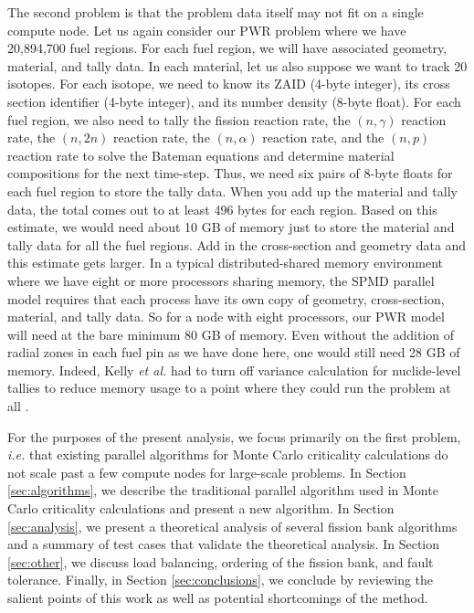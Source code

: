 The second problem is that the problem data itself may not fit on a
single compute node. Let us again consider our PWR problem where we
have 20,894,700 fuel regions. For each fuel region, we will have
associated geometry, material, and tally data. In each material, let
us also suppose we want to track 20 isotopes. For each isotope, we
need to know its ZAID (4-byte integer), its cross section identifier
(4-byte integer), and its number density (8-byte float). For each fuel
region, we also need to tally the fission reaction rate, the
$(n,\gamma)$ reaction rate, the $(n,2n)$ reaction rate, the
$(n,\alpha)$ reaction rate, and the $(n,p)$ reaction rate to solve the
Bateman equations and determine material compositions for the next
time-step. Thus, we need six pairs of 8-byte floats for each fuel
region to store the tally data. When you add up the material and tally
data, the total comes out to at least 496 bytes for each region. Based
on this estimate, we would need about 10 GB of memory just to store
the material and tally data for all the fuel regions. Add in the
cross-section and geometry data and this estimate gets larger. In a
typical distributed-shared memory environment where we have eight or
more processors sharing memory, the SPMD parallel model requires that
each process have its own copy of geometry, cross-section, material,
and tally data. So for a node with eight processors, our PWR model
will need at the bare minimum 80 GB of memory. Even without the
addition of radial zones in each fuel pin as we have done here, one
would still need 28 GB of memory. Indeed, Kelly {\em et al.} had to
turn off variance calculation for nuclide-level tallies to reduce
memory usage to a point where they could run the problem at all
\cite{kelly}.

For the purposes of the present analysis, we focus primarily on the
first problem, {\em i.e.} that existing parallel algorithms for Monte
Carlo criticality calculations do not scale past a few compute nodes
for large-scale problems. In Section \ref{sec:algorithms}, we describe
the traditional parallel algorithm used in Monte Carlo criticality
calculations and present a new algorithm. In Section
\ref{sec:analysis}, we present a theoretical analysis of several
fission bank algorithms and a summary of test cases that validate the
theoretical analysis. In Section \ref{sec:other}, we discuss load
balancing, ordering of the fission bank, and fault tolerance. Finally,
in Section \ref{sec:conclusions}, we conclude by reviewing the salient
points of this work as well as potential shortcomings of the method.

